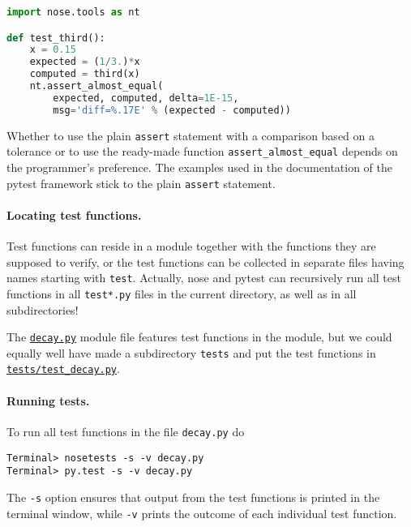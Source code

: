 \documentclass[graybox,sectrefs,envcountresetchap,open=right,final]{svmonodo}
\begin{document}
\begin{lstlisting}[language=python,style=blue1_bluegreen]
import nose.tools as nt

def test_third():
    x = 0.15
    expected = (1/3.)*x
    computed = third(x)
    nt.assert_almost_equal(
        expected, computed, delta=1E-15,
        msg='diff=%.17E' % (expected - computed))

\end{lstlisting}


Whether to use the plain \texttt{assert} statement with a comparison based on
a tolerance or to use the ready-made function \Verb!assert_almost_equal!
depends on the programmer's preference. The examples used in the
documentation of the pytest framework stick to the plain \texttt{assert}
statement.

\paragraph{Locating test functions.}
Test functions can reside in a module together with the functions they
are supposed to verify, or the test functions can be collected in
separate files having names starting with \texttt{test}. Actually,
nose and pytest can recursively run all test functions
in all \texttt{test*.py}
files in the current directory, as well as in all subdirectories!

The \href{{http://tinyurl.com/ofkw6kc/softeng/decay.py}}{\nolinkurl{decay.py}} module file features
test functions in the module, but we could equally well have made
a subdirectory \texttt{tests} and put the test functions in
\href{{http://tinyurl.com/ofkw6kc/softeng/tests/test_decay.py}}{\nolinkurl{tests/test_decay.py}}.

\paragraph{Running tests.}
To run all test functions in the file \texttt{decay.py} do




\begin{Verbatim}[frame=lines,label=\fbox{{\tiny Terminal}},framesep=2.5mm,framerule=0.7pt,fontsize=\fontsize{9pt}{9pt}]
Terminal> nosetests -s -v decay.py
Terminal> py.test -s -v decay.py

\end{Verbatim}

The \texttt{-s} option ensures that output from the test functions is printed
in the terminal window, while \texttt{-v} prints the outcome of each individual
test function.
\end{document}
